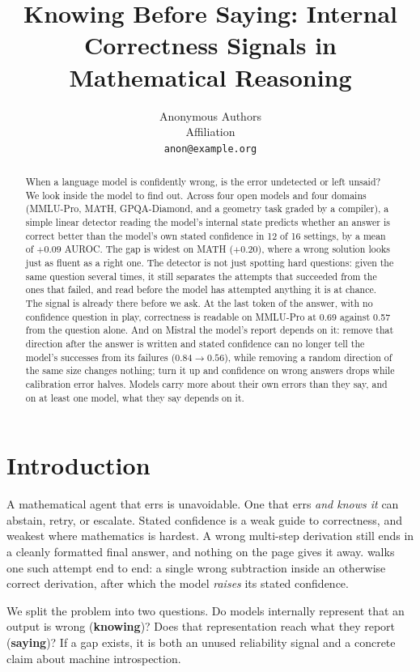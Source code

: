 \documentclass{article}
\title{Knowing Before Saying: Internal Correctness Signals in Mathematical Reasoning}
\author{%
  Anonymous Authors\\
  Affiliation\\
  \texttt{anon@example.org}
}
\begin{document}
\maketitle

\begin{abstract}
When a language model is confidently wrong, is the error undetected or left unsaid?
We look inside the model to find out.
Across four open models and four domains (MMLU-Pro, MATH, GPQA-Diamond, and a geometry task graded by a compiler), a simple linear detector reading the model's internal state predicts whether an answer is correct better than the model's own stated confidence in 12 of 16 settings, by a mean of $+0.09$ AUROC.
The gap is widest on MATH ($+0.20$), where a wrong solution looks just as fluent as a right one.
The detector is not just spotting hard questions: given the same question several times, it still separates the attempts that succeeded from the ones that failed, and read before the model has attempted anything it is at chance.
The signal is already there before we ask.
At the last token of the answer, with no confidence question in play, correctness is readable on MMLU-Pro at 0.69 against 0.57 from the question alone.
And on Mistral the model's report depends on it: remove that direction after the answer is written and stated confidence can no longer tell the model's successes from its failures ($0.84 \to 0.56$), while removing a random direction of the same size changes nothing; turn it up and confidence on wrong answers drops while calibration error halves.
Models carry more about their own errors than they say, and on at least one model, what they say depends on it.
\end{abstract}

\section{Introduction}
\label{sec:intro}

A mathematical agent that errs is unavoidable.
One that errs \emph{and knows it} can abstain, retry, or escalate.
Stated confidence is a weak guide to correctness, and weakest where mathematics is hardest.
A wrong multi-step derivation still ends in a cleanly formatted final answer, and nothing on the page gives it away.
 walks one such attempt end to end: a single wrong subtraction inside an otherwise correct derivation, after which the model \emph{raises} its stated confidence.

We split the problem into two questions.
Do models internally represent that an output is wrong (\textbf{knowing})?
Does that representation reach what they report (\textbf{saying})?
If a gap exists, it is both an unused reliability signal and a concrete claim about machine introspection.
\end{document}
